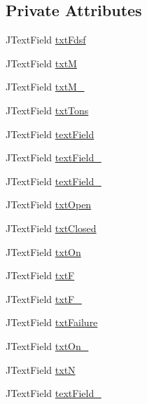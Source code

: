 \subsection*{Private Attributes}
\begin{DoxyCompactItemize}
\item 
J\+Text\+Field \hyperlink{classtrainModel_1_1trainModeUI_a20696c2664cf2d16d74fe7748ca27528}{txt\+Fdsf}
\item 
J\+Text\+Field \hyperlink{classtrainModel_1_1trainModeUI_a4f1c859e90a27f6311c07ee97ba967e6}{txtM}
\item 
J\+Text\+Field \hyperlink{classtrainModel_1_1trainModeUI_acd902e1db60c895f5be53727b0f248ee}{txt\+M\+\_}
\item 
J\+Text\+Field \hyperlink{classtrainModel_1_1trainModeUI_a7a675397b2b4acb01241e1ce1374976d}{txt\+Tons}
\item 
J\+Text\+Field \hyperlink{classtrainModel_1_1trainModeUI_a3e9fdcb1083dfa4315b8dda29ee75042}{text\+Field}
\item 
J\+Text\+Field \hyperlink{classtrainModel_1_1trainModeUI_a857bc4073de2afc7380c4d0b964b4d9f}{text\+Field\+\_}
\item 
J\+Text\+Field \hyperlink{classtrainModel_1_1trainModeUI_a640da80d6f928a8eb0fdbabee60889e1}{text\+Field\+\_}
\item 
J\+Text\+Field \hyperlink{classtrainModel_1_1trainModeUI_a7ebf4529ce67fc221de9a471ba139eb1}{txt\+Open}
\item 
J\+Text\+Field \hyperlink{classtrainModel_1_1trainModeUI_aca941e25e51f32885348cf98ac64cc4e}{txt\+Closed}
\item 
J\+Text\+Field \hyperlink{classtrainModel_1_1trainModeUI_ab60f67f2cb49f6fe6856d516b0bda156}{txt\+On}
\item 
J\+Text\+Field \hyperlink{classtrainModel_1_1trainModeUI_a33c6151bdffc6fc460e5fb0f8b54ce3f}{txtF}
\item 
J\+Text\+Field \hyperlink{classtrainModel_1_1trainModeUI_adfd0ca58f1fdeea7894024f084f6024d}{txt\+F\+\_}
\item 
J\+Text\+Field \hyperlink{classtrainModel_1_1trainModeUI_a44943cda5e52d523f428baefd0bea852}{txt\+Failure}
\item 
J\+Text\+Field \hyperlink{classtrainModel_1_1trainModeUI_a8fc05f34670a7a3e35bec5d14f3a34c1}{txt\+On\+\_}
\item 
J\+Text\+Field \hyperlink{classtrainModel_1_1trainModeUI_aa84a6b1ee3e755def97e24e270b8b376}{txtN}
\item 
J\+Text\+Field \hyperlink{classtrainModel_1_1trainModeUI_ac528e4e64f0a0f0bb7d1ede997059b1a}{text\+Field\+\_}

\end{DoxyCompactItemize}
